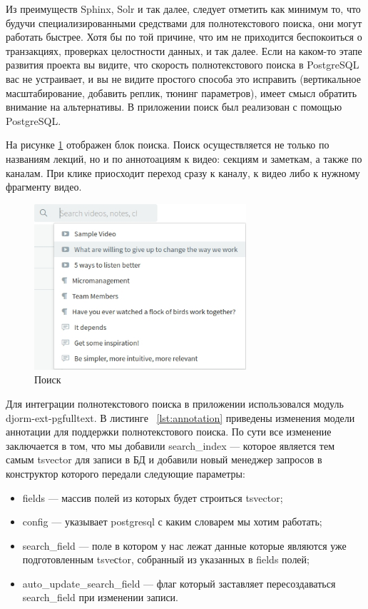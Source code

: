 Из преимуществ Sphinx, Solr и так далее, следует отметить как минимум то, что будучи специализированными
средствами для полнотекстового поиска, они могут работать быстрее. Хотя бы по той причине, что им не приходится
беспокоиться о транзакциях, проверках целостности данных, и так далее. Если на каком-то этапе развития проекта
вы видите, что скорость полнотекстового поиска в PostgreSQL вас не устраивает, и вы не видите простого способа
это исправить (вертикальное масштабирование, добавить реплик, тюнинг параметров), имеет смысл обратить внимание
на альтернативы. В приложении поиск был реализован с помощью PostgreSQL.

На рисунке \ref{search} отображен блок поиска. Поиск осуществляется не только по названиям лекций,
но и по аннотоациям к видео: секциям и заметкам, а также по каналам. При клике приосходит переход
сразу к каналу, к видео либо к нужному фрагменту видео.

\begin{figure}
  \centering
  \includegraphics[width=0.7\textwidth]{images/search.jpg}
  \caption{Поиск}\label{search}
\end{figure}

Для интеграции полнотекстового поиска в приложении использовался модуль djorm-ext-pgfulltext. В листинге ~\ref{lst:annotation}
приведены изменения модели аннотации для поддержки полнотекстового поиска. По сути все изменение заключается в том,
что мы добавили search\_index — которое является тем самым tsvector для записи в БД и добавили
новый менеджер запросов в конструктор которого передали следующие параметры:

\begin{itemize}[wide,topsep=0pt]
  \itemsep0em
  \item fields — массив полей из которых будет строиться tsvector;
  \item config — указывает postgresql с каким словарем мы хотим работать;
  \item search\_field — поле в котором у нас лежат данные которые являются уже подготовленным tsveсtor, собранный из указанных в fields полей;
  \item auto\_update\_search\_field — флаг который заставляет пересоздаваться\\ search\_field при изменении записи.
\end{itemize}

